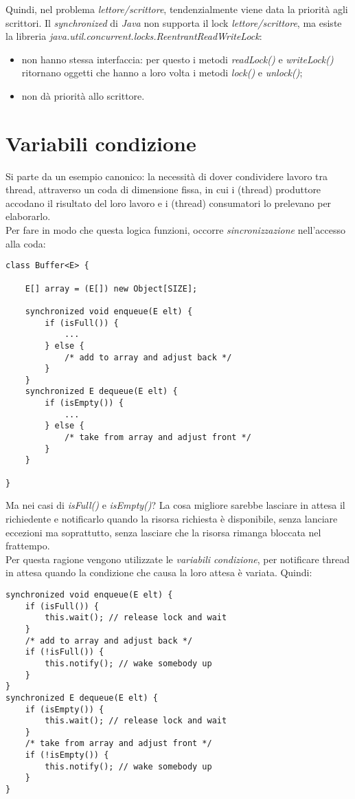 Quindi, nel problema \textit{lettore/scrittore}, tendenzialmente viene data la priorità agli scrittori.
Il \textit{synchronized} di \textit{Java} non supporta il lock \textit{lettore/scrittore}, ma esiste la libreria \textit{java.util.concurrent.locks.ReentrantReadWriteLock}:
\begin{itemize}
	\item non hanno stessa interfaccia: per questo i metodi \textit{readLock()} e \textit{writeLock()} ritornano oggetti che hanno a loro volta i metodi \textit{lock()} e \textit{unlock()};
	\item non d\`{a} priorità allo scrittore.
\end{itemize}

\section{Variabili condizione}
Si parte da un esempio canonico: la necessità di dover condividere lavoro tra thread, attraverso un coda di dimensione fissa, in cui i (thread) produttore accodano il risultato del loro lavoro e i (thread) consumatori lo prelevano per elaborarlo. \\
\newpage
Per fare in modo che questa logica funzioni, occorre \textit{sincronizzazione} nell'accesso alla coda:
\begin{lstlisting}
class Buffer<E> {

	E[] array = (E[]) new Object[SIZE];
	
	synchronized void enqueue(E elt) {
		if (isFull()) {
			...
		} else {
			/* add to array and adjust back */
		}
	}
	synchronized E dequeue(E elt) {
		if (isEmpty()) {
			...
		} else {
			/* take from array and adjust front */
		}
	}

}
\end{lstlisting}
Ma nei casi di \textit{isFull()} e \textit{isEmpty()}? La cosa migliore sarebbe lasciare in attesa il richiedente e notificarlo quando la risorsa richiesta è disponibile, senza lanciare eccezioni ma soprattutto, senza lasciare che la risorsa rimanga bloccata nel frattempo. \\
Per questa ragione vengono utilizzate le \textit{variabili condizione}, per notificare thread in attesa quando la condizione che causa la loro attesa è variata. Quindi:
\begin{lstlisting}
synchronized void enqueue(E elt) {
	if (isFull()) {
		this.wait(); // release lock and wait
	}
	/* add to array and adjust back */
	if (!isFull()) {
		this.notify(); // wake somebody up
	}
}
synchronized E dequeue(E elt) {
	if (isEmpty()) {
		this.wait(); // release lock and wait
	}
	/* take from array and adjust front */
	if (!isEmpty()) {
		this.notify(); // wake somebody up
	}
}
\end{lstlisting}

